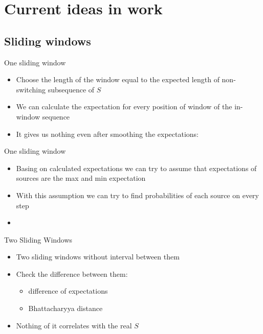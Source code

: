 \documentclass[hyperref=unicode,graphics=pdflatex,13pt]{beamer}
\begin{document}


\section{Current ideas in work}

\subsection{Sliding windows}
\begin{frame}{One sliding window}
\begin{itemize}
   \item Choose the length of the window equal to the expected length of non-switching subsequence of $S$
   \item We can calculate the expectation for every position of window of the in-window sequence
   \item It gives us nothing even after smoothing the expectations:
\end{itemize}
\end{frame}

\begin{frame}{One sliding window}
\begin{itemize}
   \item Basing on calculated expectations we can try to assume that expectations of sources are the max and min expectation
   \item With this assumption we can try to find probabilities of each source on every step
   \item %
\end{itemize}
\end{frame}

\begin{frame}{Two Sliding Windows}
\begin{itemize}
   \item Two sliding windows without interval between them
   \item Check the difference between them:
   \begin{itemize}
      \item difference of expectations
      \item Bhattacharyya distance
   \end{itemize}
   \item Nothing of it correlates with the real $S$
\end{itemize}

\end{frame}
\end{document}
